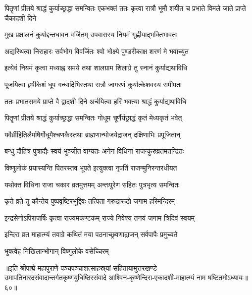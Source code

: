 \threelineshloka
{पितॄणां प्रीतये श्राद्धं कुर्याच्छ्रद्धा समन्वितः}
{एकभक्तं ततः कृत्वा रात्रौ भूमौ शयीत च}
{प्रभाते विमले जाते प्राप्ते चैकादशी दिने}%

\twolineshloka
{मुख प्रक्षालनं कुर्याद्दन्तधावन वर्जितम्}
{उपवासस्य नियमं गृह्णीयाद्भक्तिभावतः}%

\twolineshloka
{अद्यस्थित्वा निराहारः सर्वभोग विवर्जितः}
{श्वो भोक्ष्ये पुण्डरीकाक्ष शरणं मे भवाच्युत}%

\twolineshloka
{इत्येवं नियमं कृत्वा मध्याह्न समये तथा}
{शालग्राम शिलाग्रे तु स्नानं कुर्याद्यथाविधि}%

\twolineshloka
{पूजयित्वा हृषीकेशं धूप गन्धादिभिस्तथा}
{रात्रौ जागरणं कुर्यात्केशवस्य समीपतः}%

\twolineshloka
{ततः प्रभातसमये प्राप्ते वै द्वादशी दिने}
{अर्चयित्वा हरिं भक्त्या श्राद्धं कुर्याद्यथाविधि}%

\twolineshloka
{पितॄणां प्रीतये श्राद्धं कुर्याच्छ्रद्धा समन्वितः}
{गोधूम चूर्णैर्यछ्राद्धं कृतं मेध्यकृतं भवेत्}%

\twolineshloka
{यवैर्व्रीहितिलैर्माषैर्गोधूमैश्चणकैस्तथा}
{ब्राह्मणान्भोजयेद्राजन् दक्षिणाभिः प्रपूजितान्}%

\twolineshloka
{बन्धु दौहित्र पुत्राद्यैः स्वयं भुञ्जीत वाग्यतः}
{अनेन विधिना राजन्कुरुव्रतमतन्द्रितः}%

\twolineshloka
{विष्णुलोकं प्रयास्यन्ति पितरस्तव भूपते}
{इत्युक्त्वा नृपतिं राजन्मुनिरन्तरधीयत}%

\twolineshloka
{यथोक्त विधिना राजा चकार व्रतमुत्तमम्}
{अन्तःपुरेण सहितः पुत्रभृत्य समन्वितः}%

\twolineshloka
{कृते व्रते तु कौन्तेय पुष्पवृष्टिरभूद्दिवः}
{तत्पिता गरुडारूढो जगाम हरिमन्दिरम्}%

\twolineshloka
{इन्द्रसेनोऽपिराजर्षिः कृत्वा राज्यमकण्टकम्}
{राज्ये निवेश्य तनयं जगाम त्रिदिवं स्वयम्}%

\twolineshloka
{इन्दिरा व्रत माहात्म्यं तवाग्रे कथितं मया}
{पठनाच्छ्रवणाद्राजन् सर्वपापैः प्रमुच्यते}%

\onelineshloka
{भुक्त्वेह निखिलान्भोगान् विष्णुलोके वसेच्चिरम्}%

॥इति श्रीपाद्मे महापुराणे पञ्चपञ्चाशत्साहस्र्यां संहितायामुत्तरखण्डे उमापतिनारदसंवादान्तर्गतकृष्णयुधिष्ठिरसंवादे आश्विन-कृष्णेन्दिरा-एकादशी-माहात्म्यं नाम षष्टितमोऽध्यायः॥६०॥



\hyperref[sec:ekadashi_mahatmyam_padma_puranam]{\closesub}
\clearpage


